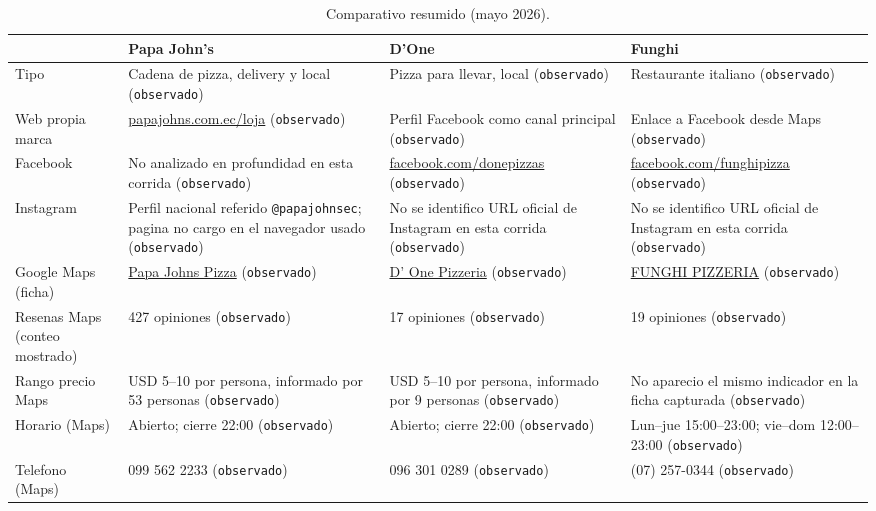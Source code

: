 \documentclass[9pt,a4paper,twocolumn,twoside]{tau-class/tau}
\begin{document}
\begin{table}[t]
  \centering
  \small
  \begin{tabular}{@{}p{3.2cm}p{3.8cm}p{3.8cm}p{3.8cm}@{}}
    \toprule
    & \textbf{Papa John's} & \textbf{D'One} & \textbf{Funghi} \\
    \midrule
    Tipo & Cadena de pizza, delivery y local (\texttt{observado}) & Pizza para llevar, local (\texttt{observado}) & Restaurante italiano (\texttt{observado}) \\
    Web propia marca & \href{https://papajohns.com.ec/loja/}{papajohns.com.ec/loja} (\texttt{observado}) & Perfil Facebook como canal principal (\texttt{observado}) & Enlace a Facebook desde Maps (\texttt{observado}) \\
    Facebook & No analizado en profundidad en esta corrida (\texttt{observado}) & \href{https://www.facebook.com/donepizzas/}{facebook.com/donepizzas} (\texttt{observado}) & \href{https://www.facebook.com/funghipizza/}{facebook.com/funghipizza} (\texttt{observado}) \\
    Instagram & Perfil nacional referido \texttt{@papajohnsec}; pagina no cargo en el navegador usado (\texttt{observado}) & No se identifico URL oficial de Instagram en esta corrida (\texttt{observado}) & No se identifico URL oficial de Instagram en esta corrida (\texttt{observado}) \\
    Google Maps (ficha) & \href{https://www.google.com/maps/place/Papa+Johns+Pizza/@-3.9947043,-79.1994322,17z/data=!3m1!4b1!4m6!3m5!1s0x91cb47ca4ea989ff:0xa356ebcb687e0b27!8m2!3d-3.9947043!4d-79.1994322!16s\%2Fg\%2F11qgchhq_6}{Papa Johns Pizza} (\texttt{observado}) & \href{https://www.google.com/maps/place/D'+One+Pizzer\%C3\%ADa/@-4.0095863,-79.2026892,17z/data=!3m1!4b1!4m6!3m5!1s0x91cb37ec2293cf37:0xc6694bc6bef821ee!8m2!3d-4.0095863!4d-79.2026892!16s\%2Fg\%2F11l2x4nmcc}{D' One Pizzeria} (\texttt{observado}) & \href{https://www.google.com/maps/place/FUNGHI+PIZZERIA/@-3.9977592,-79.1982236,17z/data=!3m1!4b1!4m6!3m5!1s0x91cb380076488db5:0x5bb04e7c085c2bb2!8m2!3d-3.9977592!4d-79.1982236!16s\%2Fg\%2F1pp2tlp7p}{FUNGHI PIZZERIA} (\texttt{observado}) \\
    Resenas Maps (conteo mostrado) & 427 opiniones (\texttt{observado}) & 17 opiniones (\texttt{observado}) & 19 opiniones (\texttt{observado}) \\
    Rango precio Maps & USD 5--10 por persona, informado por 53 personas (\texttt{observado}) & USD 5--10 por persona, informado por 9 personas (\texttt{observado}) & No aparecio el mismo indicador en la ficha capturada (\texttt{observado}) \\
    Horario (Maps) & Abierto; cierre 22:00 (\texttt{observado}) & Abierto; cierre 22:00 (\texttt{observado}) & Lun--jue 15:00--23:00; vie--dom 12:00--23:00 (\texttt{observado}) \\
    Telefono (Maps) & 099 562 2233 (\texttt{observado}) & 096 301 0289 (\texttt{observado}) & (07) 257-0344 (\texttt{observado}) \\
    \bottomrule
  \end{tabular}
  \caption{Comparativo resumido (mayo 2026).}
  \label{tab:matriz}
\end{table}
\end{document}
